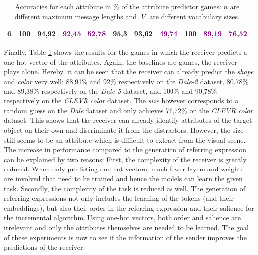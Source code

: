 \begin{table}[ht]
\begin{tabular}{cc|ccc|ccc|ccc}
        {6}                           & {100}   & {94,92}                             & \textcolor{purple}{92,45}           & \textcolor{purple}{52,78}                & {95,3}                          & {93,62}                         & \textcolor{purple}{49,74}      & {100}                           & \textcolor{purple}{89,19}       & \textcolor{purple}{76,52}      \\
        \bottomrule
    \end{tabular}
    \caption{Accuracies for each attribute in \% of the attribute predictor games: $n$ are different maximum message lengths and $|V|$ are different vocabulary sizes.}
    \label{tab:results:attribute-predictor-game}
\end{table}

Finally, Table \ref{tab:results:attribute-predictor-game} shows the results for the games in which the receiver predicts a one-hot vector of the attributes.
Again, the baselines are games, the receiver plays alone.
Hereby, it can be seen that the receiver can already predict the \emph{shape} and \emph{color}  very well: 88,91\% and 92\% respectively on the \emph{Dale-2} dataset, 80,78\% and 89,38\% respectively on the \emph{Dale-5} dataset, and 100\% and 90,78\% respectively on the \emph{CLEVR color} dataset.
The \emph{size} however corresponds to a random guess on the \emph{Dale} dataset and only achieves 76,72\% on the \emph{CLEVR color} dataset.
This shows that the receiver can already identify attributes of the target object on their own and discriminate it from the distractors.
However, the size still seems to be an attribute which is difficult to extract from the visual scene.
The increase in performance compared to the generation of referring expression can be explained by two reasons:
First, the complexity of the receiver is greatly reduced.
When only predicting one-hot vectors, much fewer layers and weights are involved that need to be trained and hence the models can learn the given task.
Secondly, the complexity of the task is reduced as well.
The generation of referring expressions not only includes the learning of the tokens (and their embeddings), but also their order in the referring expression and their salience for the incremental algorithm.
Using one-hot vectors, both order and salience are irrelevant and only the attributes themselves are needed to be learned.
The goal of these experiments is now to see if the information of the sender improves the predictions of the receiver.

